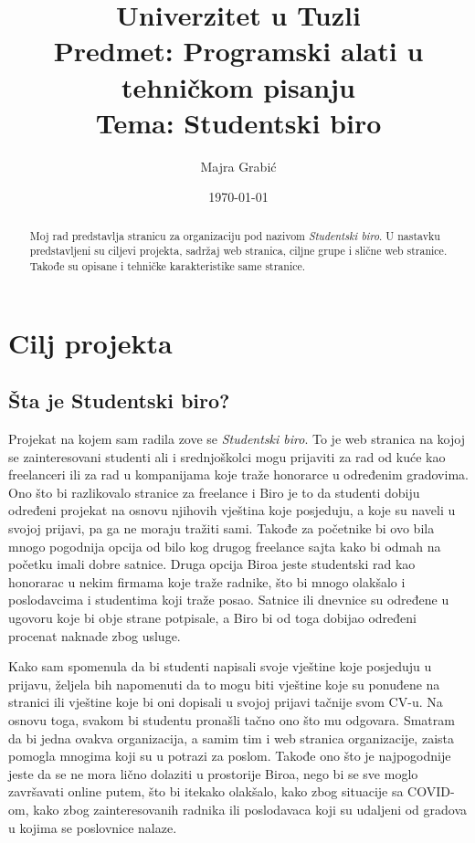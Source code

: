 \documentclass[a4paper]{article}
\title{
\huge Univerzitet u Tuzli\\
Predmet: Programski alati u tehničkom pisanju\\
Tema: Studentski biro}
\author{Majra Grabić}
\date{\today}
\begin{document}
\maketitle
\pagebreak
\tableofcontents
\pagebreak
\begin{abstract}
Moj rad predstavlja stranicu za organizaciju pod nazivom \emph{Studentski biro}. U nastavku predstavljeni su ciljevi projekta, sadržaj web stranica, ciljne grupe i slične web stranice. Takođe su opisane i tehničke karakteristike same stranice.
\end{abstract}

\section{Cilj projekta}
\subsection{Šta je Studentski biro?}
Projekat na kojem sam radila zove se \emph{Studentski biro}. To je web stranica na kojoj se zainteresovani studenti ali i srednjoškolci mogu prijaviti za rad od kuće kao freelanceri ili za rad u kompanijama koje traže honorarce u određenim gradovima. Ono što bi razlikovalo stranice za freelance i Biro je to da studenti dobiju određeni projekat na osnovu njihovih vještina koje posjeduju, a koje su naveli u svojoj prijavi, pa ga ne moraju tražiti sami. Takođe za početnike bi ovo bila mnogo pogodnija opcija od bilo kog drugog freelance sajta kako bi odmah na početku imali dobre satnice. 
Druga opcija Biroa jeste studentski rad kao honorarac u nekim firmama koje traže radnike, što bi mnogo olakšalo i poslodavcima i studentima koji traže posao. Satnice ili dnevnice su određene u ugovoru koje bi obje strane potpisale, a Biro bi od toga dobijao određeni procenat naknade zbog usluge. 

Kako sam spomenula da bi studenti napisali svoje vještine koje posjeduju u prijavu, željela bih napomenuti da to mogu biti vještine koje su ponuđene na stranici ili vještine koje bi oni dopisali u svojoj prijavi tačnije svom CV-u. Na osnovu toga, svakom bi studentu pronašli tačno ono što mu odgovara. Smatram da bi jedna ovakva organizacija, a samim tim i web stranica organizacije, zaista pomogla mnogima koji su u potrazi za poslom. Takođe ono što je najpogodnije jeste da se ne mora lično dolaziti u prostorije Biroa, nego bi se sve moglo završavati online putem, što bi itekako olakšalo, kako zbog situacije sa COVID-om, kako zbog zainteresovanih radnika ili poslodavaca koji su udaljeni od gradova u kojima se poslovnice nalaze. 
\end{document}
